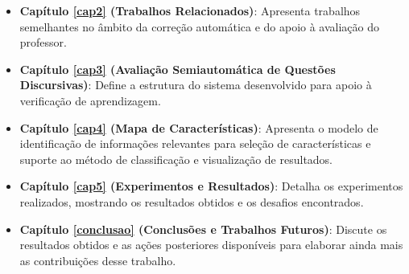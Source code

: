 \begin{itemize}
\itemsep=-.3mm
\item{\textbf{Capítulo \ref{cap2} (Trabalhos Relacionados)}: Apresenta trabalhos semelhantes no âmbito da correção automática e do apoio à avaliação do professor.
}
\item{ \textbf{Capítulo \ref{cap3} (Avaliação Semiautomática de Questões Discursivas)}: Define a estrutura do sistema desenvolvido para apoio à verificação de aprendizagem.  
}
\item{ \textbf{Capítulo \ref{cap4} (Mapa de Características)}: Apresenta o modelo de identificação de informações relevantes para seleção de características e suporte ao método de classificação e visualização de resultados. 
}
\item{ \textbf{Capítulo \ref{cap5} (Experimentos e Resultados)}: Detalha os experimentos realizados, mostrando os resultados obtidos e os desafios encontrados.
}
\item{ \textbf{Capítulo \ref{conclusao} (Conclusões e Trabalhos Futuros)}: Discute os resultados obtidos e as ações posteriores disponíveis para elaborar ainda mais as contribuições desse trabalho.
}
\end{itemize}

